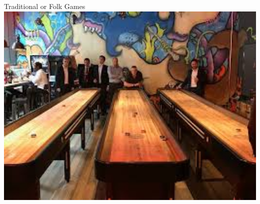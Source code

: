\begin{frame}{Traditional or Folk Games}
	\includegraphics[width=1.0\textwidth, height=0.7\textheight]{shuffle_board}
\end{frame}